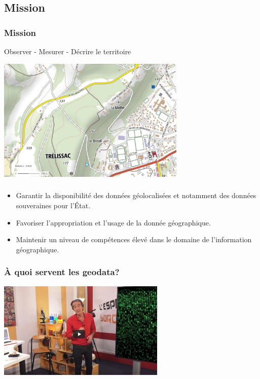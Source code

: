 \documentclass[svgnames,11pt]{beamer}
\begin{document}
\subsection{Mission}
\begin{frame}
    \frametitle{Mission}

    \begin{center}
        {\Large Observer - Mesurer - Décrire le territoire}
        \begin{center}
            \centering
            \includegraphics[width=9cm]{ressources/mission-ign.png}
            \label{IMG}
        \end{center}
    \end{center}
\end{frame}
\begin{frame}
    \frametitle{}

    \begin{itemize}
        \item Garantir la disponibilité des données géolocalisées et notamment des données souveraines pour l'État.
        \item Favoriser l’appropriation et l’usage de la donnée géographique.
        \item Maintenir un niveau de compétences élevé dans le domaine de l'information géographique.

    \end{itemize}

\end{frame}
\begin{frame}
    \frametitle{À quoi servent les geodata?}
     
\begin{center}
    \href{ressources/geodata.mp4}{\includegraphics[width=8cm]{ressources/geodata.png}}

\end{center}
\end{frame}
\end{document}
